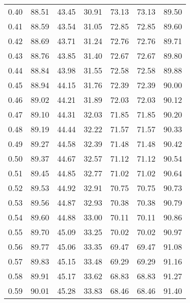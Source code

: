 \begin{tabular}{|c|c|c|c|c|c|c|}
      0.40 &     88.51 &     43.45 &      30.91 &   73.13 &      73.13 &         89.50 \\
      0.41 &     88.59 &     43.54 &      31.05 &   72.85 &      72.85 &         89.60 \\
      0.42 &     88.69 &     43.71 &      31.24 &   72.76 &      72.76 &         89.71 \\
      0.43 &     88.76 &     43.85 &      31.40 &   72.67 &      72.67 &         89.80 \\
      0.44 &     88.84 &     43.98 &      31.55 &   72.58 &      72.58 &         89.88 \\
      0.45 &     88.94 &     44.15 &      31.76 &   72.39 &      72.39 &         90.00 \\
      0.46 &     89.02 &     44.21 &      31.89 &   72.03 &      72.03 &         90.12 \\
      0.47 &     89.10 &     44.31 &      32.03 &   71.85 &      71.85 &         90.20 \\
      0.48 &     89.19 &     44.44 &      32.22 &   71.57 &      71.57 &         90.33 \\
      0.49 &     89.27 &     44.58 &      32.39 &   71.48 &      71.48 &         90.42 \\
      0.50 &     89.37 &     44.67 &      32.57 &   71.12 &      71.12 &         90.54 \\
      0.51 &     89.45 &     44.85 &      32.77 &   71.02 &      71.02 &         90.64 \\
      0.52 &     89.53 &     44.92 &      32.91 &   70.75 &      70.75 &         90.73 \\
      0.53 &     89.56 &     44.87 &      32.93 &   70.38 &      70.38 &         90.79 \\
      0.54 &     89.60 &     44.88 &      33.00 &   70.11 &      70.11 &         90.86 \\
      0.55 &     89.70 &     45.09 &      33.25 &   70.02 &      70.02 &         90.97 \\
      0.56 &     89.77 &     45.06 &      33.35 &   69.47 &      69.47 &         91.08 \\
      0.57 &     89.83 &     45.15 &      33.48 &   69.29 &      69.29 &         91.16 \\
      0.58 &     89.91 &     45.17 &      33.62 &   68.83 &      68.83 &         91.27 \\
      0.59 &     90.01 &     45.28 &      33.83 &   68.46 &      68.46 &         91.40 \\

\end{tabular}
